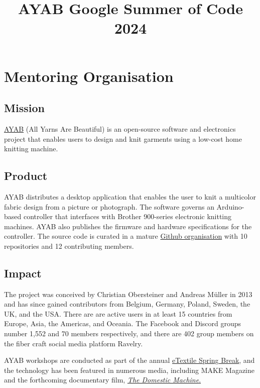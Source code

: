 \documentclass{article}
\title{AYAB Google Summer of Code 2024}
\author{\color{red}{\textbf{Application Deadline: Feb 6, 2024}}}
\begin{document}
\maketitle

\section{Mentoring Organisation}

\subsection{Mission}

\href{https://ayab-knitting.com/}{AYAB} (All Yarns Are Beautiful) is an open-source software and electronics project that enables users to design and knit garments using a low-cost home knitting machine.

\subsection{Product}

AYAB distributes a desktop application that enables the user to knit a multicolor fabric design from a picture or photograph. The software governs an Arduino-based controller that interfaces with Brother 900-series electronic knitting machines. AYAB also publishes the firmware and hardware specifications for the controller. The source code is curated in a mature \href{https://github.com/AllYarnsAreBeautiful}{Github organisation} with 10 repositories and 12 contributing members.

\subsection{Impact}

The project was conceived by Christian Obersteiner and Andreas M{\"u}ller in 2013 and has since gained contributors from Belgium, Germany, Poland, Sweden, the UK, and the USA. There are are active users in at least 15 countries from Europe, Asia, the Americas, and Oceania. The Facebook and Discord groups number 1,552 and 70 members respectively, and there are 402 group members on the fiber craft social media platform Ravelry.

AYAB workshops are conducted as part of the annual \href{http://etextilespringbreak.org/}{eTextile Spring Break}, and the technology has been featured in numerous media, including MAKE Magazine and the forthcoming documentary film, \href{https://www.thedomesticmachine.com/}{\textit{The Domestic Machine}.}
\end{document}
